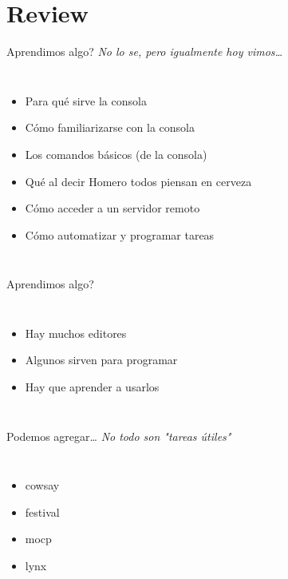 \section{Review}


\begin{frame}{Aprendimos algo?}
\textit{ No lo se, pero igualmente hoy vimos\ldots }
\bigskip
\begin{columns}[onlytextwidth]
	\begin{itemize}
		\item Para qu\'e sirve la consola
		\item C\'omo familiarizarse con la consola
		\item Los comandos b\'asicos (de la consola)
		\item Qu\'e al decir Homero todos piensan en cerveza
		\item C\'omo acceder a un servidor remoto
		\item C\'omo automatizar y programar tareas
	\end{itemize}
\end{columns}
\end{frame}



\begin{frame}{Aprendimos algo?}
\begin{columns}[onlytextwidth]
\begin{itemize}
	\item Hay muchos editores
	\item Algunos sirven para programar
	\item Hay que aprender a usarlos
\end{itemize}
\begin{center}
\end{center}
\end{columns}
\end{frame}



\begin{frame}{Podemos agregar\ldots}
\textit{ No todo son "tareas \'utiles" }
\begin{columns}[onlytextwidth]
\begin{itemize}
	\item cowsay
	\item festival
	\item mocp
	\item lynx
\end{itemize}
\begin{center}
\end{center}
\end{columns}
\end{frame}

